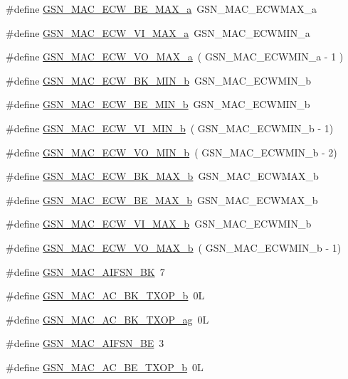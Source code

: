 \begin{DoxyCompactItemize}
\item 
\#define \hyperlink{a00523_a2d4b61be357a375bea981bf1ecb6264d}{GSN\_\-MAC\_\-ECW\_\-BE\_\-MAX\_\-a}~GSN\_\-MAC\_\-ECWMAX\_\-a
\item 
\#define \hyperlink{a00523_a7920319f793fb32861405f08d5b39b70}{GSN\_\-MAC\_\-ECW\_\-VI\_\-MAX\_\-a}~GSN\_\-MAC\_\-ECWMIN\_\-a
\item 
\#define \hyperlink{a00523_abc21841953ee9eb0f9b3a81882ee3ea5}{GSN\_\-MAC\_\-ECW\_\-VO\_\-MAX\_\-a}~( GSN\_\-MAC\_\-ECWMIN\_\-a -\/ 1 )
\item 
\#define \hyperlink{a00523_a421de5cf804d0a973f5393fabc543bd6}{GSN\_\-MAC\_\-ECW\_\-BK\_\-MIN\_\-b}~GSN\_\-MAC\_\-ECWMIN\_\-b
\item 
\#define \hyperlink{a00523_ab0ff3f080aa2e256540170abf159e076}{GSN\_\-MAC\_\-ECW\_\-BE\_\-MIN\_\-b}~GSN\_\-MAC\_\-ECWMIN\_\-b
\item 
\#define \hyperlink{a00523_a576a3aa4cb41ef36984ba8699c985220}{GSN\_\-MAC\_\-ECW\_\-VI\_\-MIN\_\-b}~( GSN\_\-MAC\_\-ECWMIN\_\-b -\/ 1)
\item 
\#define \hyperlink{a00523_abf045ff51b78cbceaecf7ea9ca9809e6}{GSN\_\-MAC\_\-ECW\_\-VO\_\-MIN\_\-b}~( GSN\_\-MAC\_\-ECWMIN\_\-b -\/ 2)
\item 
\#define \hyperlink{a00523_a016847511b529ce8d925db6a6f017346}{GSN\_\-MAC\_\-ECW\_\-BK\_\-MAX\_\-b}~GSN\_\-MAC\_\-ECWMAX\_\-b
\item 
\#define \hyperlink{a00523_a0baa7df51be4828cc82d54235fa35346}{GSN\_\-MAC\_\-ECW\_\-BE\_\-MAX\_\-b}~GSN\_\-MAC\_\-ECWMAX\_\-b
\item 
\#define \hyperlink{a00523_abaa42d440b9141aaf319c55689640ad7}{GSN\_\-MAC\_\-ECW\_\-VI\_\-MAX\_\-b}~GSN\_\-MAC\_\-ECWMIN\_\-b
\item 
\#define \hyperlink{a00523_a0959b65e1f676c611f1efd6aef99871d}{GSN\_\-MAC\_\-ECW\_\-VO\_\-MAX\_\-b}~( GSN\_\-MAC\_\-ECWMIN\_\-b -\/ 1)
\item 
\#define \hyperlink{a00523_a6a8ecd7a182ca0cf660b444399f3d9f0}{GSN\_\-MAC\_\-AIFSN\_\-BK}~7
\item 
\#define \hyperlink{a00523_aa051a861f0bd8289e4529858c66e7ef5}{GSN\_\-MAC\_\-AC\_\-BK\_\-TXOP\_\-b}~0L
\item 
\#define \hyperlink{a00523_a5b9233758256a20a02335ebc50589f06}{GSN\_\-MAC\_\-AC\_\-BK\_\-TXOP\_\-ag}~0L
\item 
\#define \hyperlink{a00523_a55ebb939376aaa5dd72c47f714b9c61d}{GSN\_\-MAC\_\-AIFSN\_\-BE}~3
\item 
\#define \hyperlink{a00523_a2f958052bd9d2407fd4d5ce76d6c1515}{GSN\_\-MAC\_\-AC\_\-BE\_\-TXOP\_\-b}~0L

\end{DoxyCompactItemize}
